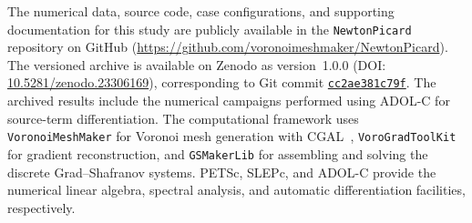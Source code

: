 The numerical data, source code, case configurations, and supporting documentation for this study are publicly available in the \texttt{NewtonPicard} repository on GitHub (\url{https://github.com/voronoimeshmaker/NewtonPicard}). The versioned archive is available on Zenodo as version~1.0.0 (DOI: \href{https://doi.org/10.5281/zenodo.23306169}{10.5281/zenodo.23306169}), corresponding to Git commit \href{https://github.com/voronoimeshmaker/NewtonPicard/commit/cc2ae381c79f10cf8f131d4b4906a6abc202881b}{\texttt{cc2ae381c79f}}. The archived results include the numerical campaigns performed using ADOL-C for source-term differentiation. The computational framework uses \texttt{VoronoiMeshMaker} for Vo\-ro\-noi mesh generation with CGAL~\cite{TheCGALProject2024CGALManual}, \texttt{VoroGradToolKit} for gradient reconstruction, and \texttt{GSMakerLib} for assembling and solving the discrete Grad--Shafranov systems. PETSc, SLEPc, and ADOL-C provide the numerical linear algebra, spectral analysis, and automatic differentiation facilities, respectively.

